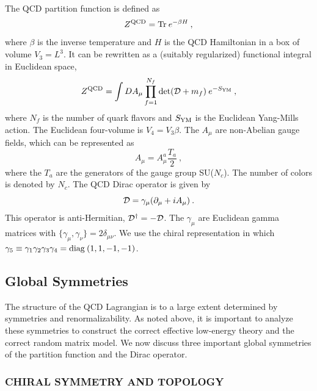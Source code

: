 The QCD partition function is defined as
\begin{equation}
  \label{trace}
  Z^{\rm QCD}={\rm Tr\:} e^{-\beta H}\:,
\end{equation}
where $\beta$ is the inverse temperature and $H$ is the QCD
Hamiltonian in a box of volume $V_3=L^3$.  It can be rewritten as a
(suitably regularized) functional integral in Euclidean space,
\begin{equation}
  \label{ZQCD}
  Z^{\rm QCD}=\int DA_\mu\prod_{f=1}^{N_f}\det({\cal D}+m_f)\:
  e^{-S_{\rm YM}}\:,
\end{equation}
where $N_f$ is the number of quark flavors and $S_{\rm YM}$ is the
Euclidean Yang-Mills action.  The Euclidean four-volume is
$V_4=V_3 \beta$.  The $A_\mu$ are non-Abelian gauge fields, which can
be represented as
\begin{equation}
  A_\mu=A_\mu^a\frac{T_a}{2}\:,
\end{equation}
where the $T_a$ are the generators of the gauge group SU($N_c$).  The
number of colors is denoted by $N_c$.  The QCD Dirac operator is given
by
\begin{equation}
  \label{Dirac}
  {\cal D}=\gamma_\mu(\partial_\mu+iA_\mu)\:.
\end{equation}
This operator is anti-Hermitian, ${\cal D}^\dagger=-{\cal D}$.  The
$\gamma_\mu$ are Euclidean gamma matrices with
$\{\gamma_\mu,\gamma_\nu\} = 2\delta_{\mu\nu}$. We use the
chiral representation in which $\gamma_5\equiv\gamma_1\gamma_2\gamma_3
\gamma_4 ={\rm diag\:}(1,1,-1,-1)$.

\subsection{Global Symmetries}
The structure of the QCD Lagrangian is to a large extent determined by
symmetries and renormalizability.  As noted above, it is 
important to analyze these symmetries to construct the correct
effective low-energy theory and the correct random matrix model.  We
now discuss three important global symmetries of the partition
function and the Dirac operator.

\subsubsection{CHIRAL SYMMETRY AND TOPOLOGY}
\label{topology}

